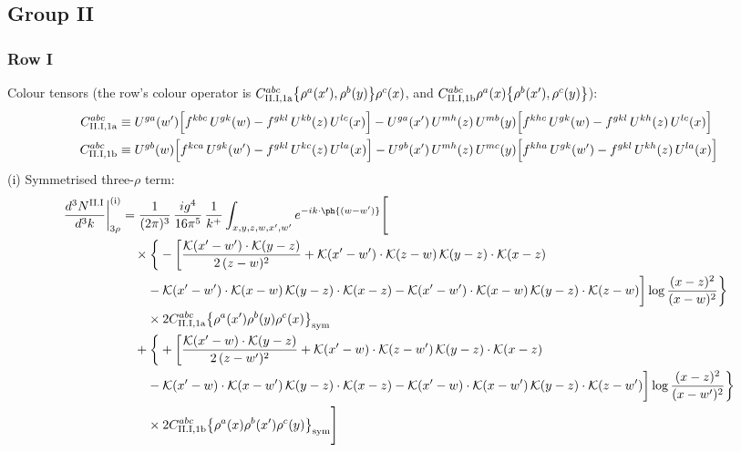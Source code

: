 \subsection{Group II}
\subsubsection*{Row I}
Colour tensors (the row's colour operator is $C^{abc}_{{\rm II.I,1a}}\big\{\rho^{a}(x'),\rho^{b}(y)\big\}\rho^{c}(x)$, and $C^{abc}_{{\rm II.I,1b}}\rho^{a}(x)\big\{\rho^{b}(x'),\rho^{c}(y)\big\}$):
\begin{align}
C^{abc}_{{\rm II.I,1a}}&\equiv U^{ga}(w')\Big[f^{kbc}\,U^{gk}(w)-f^{gkl}\,U^{kb}(z)\,U^{lc}(x)\Big]-U^{ga}(x')\,U^{mh}(z)\,U^{mb}(y)\Big[f^{khc}\,U^{gk}(w)-f^{gkl}\,U^{kh}(z)\,U^{lc}(x)\Big]\notag\\
C^{abc}_{{\rm II.I,1b}}&\equiv U^{gb}(w)\Big[f^{kca}\,U^{gk}(w')-f^{gkl}\,U^{kc}(z)\,U^{la}(x)\Big]-U^{gb}(x')\,U^{mh}(z)\,U^{mc}(y)\Big[f^{kha}\,U^{gk}(w')-f^{gkl}\,U^{kh}(z)\,U^{la}(x)\Big]\notag
\end{align}
(i) Symmetrised three-$\rho$ term:
\begin{align}
\frac{d^{3}N^{\rm II.I}}{d^{3}k}\bigg|^{\rm (i)}_{3\rho}&=\frac{1}{(2\pi)^{3}}\,\frac{ig^{4}}{16\pi^{5}}\,\frac{1}{k^{+}}\int_{x,y,z,w,x',w'}e^{-ik\cdot\ph{(w-w')}}\Bigg[\notag\\
&\quad\times\bigg\{-\bigg[\frac{\mathcal{K}(x'-w')\cdot\mathcal{K}(y-z)}{2\,(z-w)^{2}}+\mathcal{K}(x'-w')\cdot\mathcal{K}(z-w)\,\mathcal{K}(y-z)\cdot\mathcal{K}(x-z)\notag\\
&\qquad-\mathcal{K}(x'-w')\cdot\mathcal{K}(x-w)\,\mathcal{K}(y-z)\cdot\mathcal{K}(x-z)-\mathcal{K}(x'-w')\cdot\mathcal{K}(x-w)\,\mathcal{K}(y-z)\cdot\mathcal{K}(z-w)\bigg]\log\frac{(x-z)^{2}}{(x-w)^{2}}\bigg\}\notag\\
&\qquad\times 2C^{abc}_{{\rm II.I,1a}}\big\{\rho^{a}(x')\rho^{b}(y)\rho^{c}(x)\big\}_{\rm sym}\notag\\
&\quad+\bigg\{+\bigg[\frac{\mathcal{K}(x'-w)\cdot\mathcal{K}(y-z)}{2\,(z-w')^{2}}+\mathcal{K}(x'-w)\cdot\mathcal{K}(z-w')\,\mathcal{K}(y-z)\cdot\mathcal{K}(x-z)\notag\\
&\qquad-\mathcal{K}(x'-w)\cdot\mathcal{K}(x-w')\,\mathcal{K}(y-z)\cdot\mathcal{K}(x-z)-\mathcal{K}(x'-w)\cdot\mathcal{K}(x-w')\,\mathcal{K}(y-z)\cdot\mathcal{K}(z-w')\bigg]\log\frac{(x-z)^{2}}{(x-w')^{2}}\bigg\}\notag\\
&\qquad\times 2C^{abc}_{{\rm II.I,1b}}\big\{\rho^{a}(x)\rho^{b}(x')\rho^{c}(y)\big\}_{\rm sym}\Bigg]\label{eq:D-II.I-3}
\end{align}

